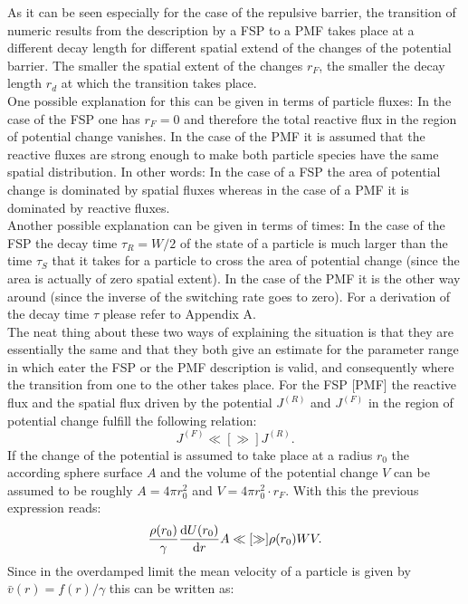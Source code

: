 As it can be seen especially for the case of the repulsive barrier, the transition of numeric results from the description by a FSP to a PMF takes place at a different decay length for different spatial extend of the changes of the potential barrier.  The smaller the spatial extent of the changes $r_F$, the smaller the decay length $r_d$ at which the transition takes place. \\
One possible explanation for this can be given in terms of particle fluxes: In the case of the FSP one has $r_F=0$ and therefore the total reactive flux in the region of potential change vanishes. In the case of the PMF it is assumed that the reactive fluxes are strong enough to make both particle species have the same spatial distribution. In other words: In the case of a FSP the area of potential change is dominated by spatial fluxes whereas in the case of a PMF it is dominated by reactive fluxes.\\
Another possible explanation can be given in terms of times: In the case of the FSP the decay time $\tau_R = W/2$ of the state of a particle is much larger than the time $\tau_S$ that it takes for a particle to cross the area of potential change (since the area is actually of zero spatial extent). In the case of the PMF it is the other way around (since the inverse of the switching rate goes to zero). For a derivation of the decay time $\tau$ please refer to Appendix A.\\
The neat thing about these two ways of explaining the situation is that they are essentially the same and that they both give  an estimate for the parameter range in which eater the FSP or the PMF description is valid, and consequently where the transition from one to the other takes place.
For the FSP [PMF] the reactive flux and the spatial flux driven by the potential $J^{(R)}$ and $J^{(F)}$ in the region of potential change fulfill the following relation:
\begin{equation}
    J^{(F)} \ll[\gg] J^{(R)}.
\end{equation}
If the change of the potential is assumed to take place at a radius $r_0$ the according sphere surface $A$ and the volume of the potential change $V$ can be assumed to be roughly $A=4 \pi r_0^2$ and $V=4 \pi r_0^2\cdot r_F$. With this the previous expression reads:
\begin{equation}
    \frac{\rho(r_0)}{\gamma}\frac{{\rm d}U(r_0)}{{\rm d}r} A \ll[\gg]\rho(r_0) W V.
\end{equation}
    Since in the overdamped limit the mean velocity of a particle is given by $\bar{v}(r) = f(r)/\gamma$ this can be written as:

